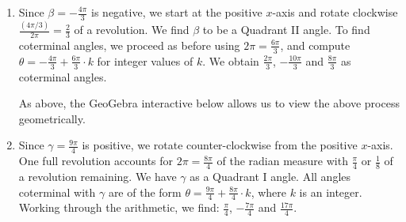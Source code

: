 \documentclass{ximera}
\begin{document}
\begin{example}
\begin{explanation}
\begin{enumerate}
Continuing to move the slider to the right sweeps out additional $\frac{\pi}{6}$ sectors in the counter-clockwise direction until we find a second (positive) coterminal angle when $n = 25$.  Hence, $\theta = \frac{25\pi}{6}$ is a second positive coterminal angle. Notice that here,  we moved $n = 24$ additional $\frac{\pi}{6}$'s, that is $24 \frac{\pi}{6} = \frac{24\pi}{6} = 4 \pi$ radians, counter-clockwise to reach this coterminal angle.

Next, we reset the slider to $n = 1$, so we're back to $\alpha = \frac{\pi}{6}$, and begin moving the slider to the \textit{left}.  This corresponds to rotating \textit{clockwise} in increments of $\frac{\pi}{6}$.  Eventually we find another coterminal angle when $n = -11$. This value of $n$ corresponds to the coterminal angle $\theta = -\frac{11\pi}{6}$. Notice that in this case, we moved $n = 12$ $\frac{\pi}{6}$'s, in other words $12 \frac{\pi}{6} = \frac{12\pi}{6} = 2\pi$ radians, \textit{clockwise} to reach this coterminal angle.

\begin{center}
\end{center}

\item  Since $\beta = - \frac{4\pi}{3}$ is negative, we start at the positive $x$-axis and rotate clockwise $\frac{\left(4 \pi / 3\right)}{2\pi} = \frac{2}{3}$ of a revolution.  We find $\beta$ to be a Quadrant II angle. To find coterminal angles, we proceed as before using $2\pi = \frac{6 \pi}{3}$,  and compute $\theta = -\frac{4 \pi}{3} + \frac{6 \pi}{3}  \cdot k$ for integer values of $k$.  We obtain $\frac{2\pi}{3}$, $-\frac{10 \pi}{3}$ and $\frac{8 \pi}{3}$ as coterminal angles.   

As above, the GeoGebra interactive below allows us to view the above process geometrically.

\begin{center}
\end{center}

\item Since $\gamma = \frac{9 \pi}{4}$ is positive, we rotate counter-clockwise from the positive $x$-axis.  One full revolution accounts for $2 \pi = \frac{8 \pi}{4}$ of the radian measure with $\frac{\pi}{4}$ or  $\frac{1}{8}$ of a revolution remaining.  We have $\gamma$ as a Quadrant I angle. All angles coterminal with $\gamma$ are of the form $\theta = \frac{9 \pi}{4} + \frac{8\pi}{4} \cdot k$, where $k$ is an integer.  Working through the arithmetic, we find: $\frac{\pi}{4}$, $-\frac{7 \pi}{4}$ and $\frac{17 \pi}{4}$.


\end{enumerate}
\end{explanation}
\end{example}
\end{document}
